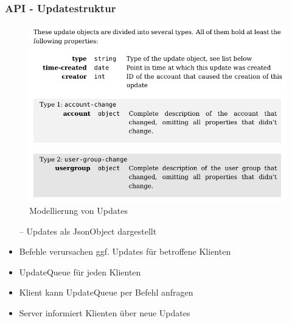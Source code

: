 \documentclass[aspectratio=1610]{beamer}
\begin{document}
		\begin{frame}[plain]
			\frametitle{API - Updatestruktur}
			\begin{minipage}{0.55\textwidth}
			\begin{figure}[h]
				\centering
				\includegraphics[width=1\textwidth]{images/Updates.png}
				\caption{Modellierung von Updates}
			\end{figure}
			\end{minipage}%
			\begin{minipage}{0.45\textwidth}
			\begin{itemize}
				\item[--] Updates als JsonObject dargestellt
				\item<2->[--] Befehle verursachen ggf. Updates für betroffene Klienten
				\item<3->[--] UpdateQueue für jeden Klienten
				\item<4->[--] Klient kann UpdateQueue per Befehl anfragen
				\item<5->[--] Server informiert Klienten über neue Updates
				
			\end{itemize}
			\end{minipage}
	\end{frame}
\end{document}

